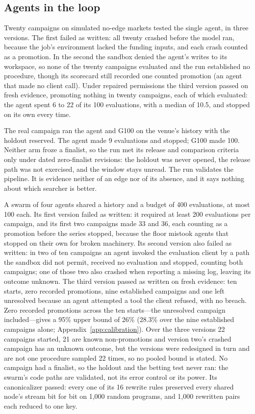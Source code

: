 \documentclass[11pt]{article}
\begin{document}
\subsection{Agents in the loop}\label{sec:pilot-agents}

Twenty campaigns on simulated no-edge markets tested the single agent, in three versions. The first failed as written: all twenty crashed before the model ran, because the job's environment lacked the funding inputs, and each crash counted as a promotion. In the second the sandbox denied the agent's writes to its workspace, so none of the twenty campaigns evaluated and the run established no procedure, though its scorecard still recorded one counted promotion (an agent that made no client call). Under repaired permissions the third version passed on fresh evidence, promoting nothing in twenty campaigns, each of which evaluated: the agent spent 6 to 22 of its 100 evaluations, with a median of 10.5, and stopped on its own every time.

The real campaign ran the agent and G100 on the venue's history with the holdout reserved. The agent made 9 evaluations and stopped; G100 made 100. Neither arm froze a finalist, so the run met its release and comparison criteria only under dated zero-finalist revisions: the holdout was never opened, the release path was not exercised, and the window stays unread. The run validates the pipeline. It is evidence neither of an edge nor of its absence, and it says nothing about which searcher is better.

A swarm of four agents shared a history and a budget of 400 evaluations, at most 100 each. Its first version failed as written: it required at least 200 evaluations per campaign, and its first two campaigns made 33 and 36, each counting as a promotion before the series stopped, because the floor mistook agents that stopped on their own for broken machinery. Its second version also failed as written: in two of ten campaigns an agent invoked the evaluation client by a path the sandbox did not permit, received no evaluation and stopped, counting both campaigns; one of those two also crashed when reporting a missing log, leaving its outcome unknown. The third version passed as written on fresh evidence: ten starts, zero recorded promotions, nine established campaigns and one left unresolved because an agent attempted a tool the client refused, with no breach. Zero recorded promotions across the ten starts---the unresolved campaign included---gives a 95\% upper bound of 26\% (28.3\% over the nine established campaigns alone; Appendix~\ref{app:calibration}). Over the three versions 22 campaigns started, 21 are known non-promotions and version two's crashed campaign has an unknown outcome, but the versions were redesigned in turn and are not one procedure sampled 22 times, so no pooled bound is stated. No campaign had a finalist, so the holdout and the betting test never ran: the swarm's code paths are validated, not its error control or its power. Its canonicalizer passed: every one of its 16 rewrite rules preserved every shared node's stream bit for bit on 1{,}000 random programs, and 1{,}000 rewritten pairs each reduced to one key.
\end{document}
